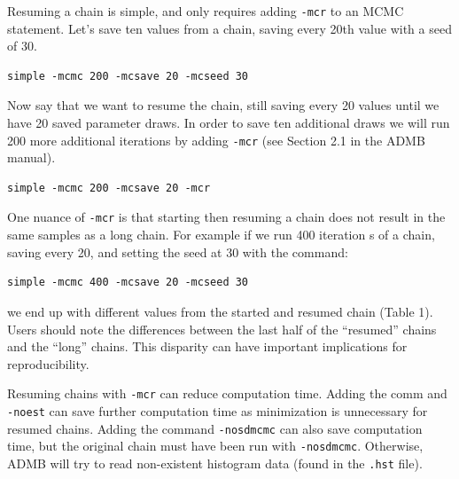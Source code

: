 \documentclass{article}\usepackage[]{graphicx}\usepackage[]{color}
\begin{document}
Resuming a chain is simple, and only requires adding \texttt{-mcr} to an MCMC 
statement. Let's save ten values from a chain, saving every 20th value with 
a seed of 30.

\begin{verbatim}
simple -mcmc 200 -mcsave 20 -mcseed 30
\end{verbatim}

Now say that we want to resume the chain, still saving every 20 values until we 
have 20 saved parameter draws. In order to save ten additional draws we will 
run 200 more additional iterations by adding \texttt{-mcr} (see Section 2.1 in the ADMB manual). 

\begin{verbatim}
simple -mcmc 200 -mcsave 20 -mcr
\end{verbatim}

One nuance of \texttt{-mcr} is that starting then resuming a chain does not
result in the same samples as a long chain. For example if we run 400 iteration
s of a chain, saving every 20, and setting the seed at 30 with the command:

\begin{verbatim}
simple -mcmc 400 -mcsave 20 -mcseed 30
\end{verbatim}

we end up with different values from the started and resumed chain (Table 1). 
Users should note the differences between the last half of the ``resumed'' chains 
and the ``long'' chains. This disparity can have important implications for
reproducibility.

Resuming chains with \texttt{-mcr} can reduce computation time. Adding the comm
and \texttt{-noest} can save further computation time as minimization is 
unnecessary for resumed chains. Adding the command \texttt{-nosdmcmc} can also 
save computation time, but the original chain must have been run with 
\texttt{-nosdmcmc}. Otherwise, ADMB will try to read non-existent histogram 
data (found in the \texttt{.hst} file).
\end{document}
